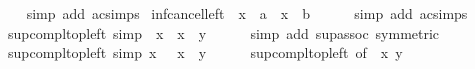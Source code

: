 \begin{isabellebody}
%
\isadelimproof
\ \ %
\endisadelimproof
%
\isatagproof
{}\isamarkupfalse%
\ {\isacharparenleft}{\kern0pt}simp\ add{\isacharcolon}{\kern0pt}\ ac{\isacharunderscore}{\kern0pt}simps{\isacharparenright}{\kern0pt}%
\endisatagproof
{\isafoldproof}%
%
\isadelimproof
\isanewline
%
\endisadelimproof
\isanewline
{}\isamarkupfalse%
\ inf{\isacharunderscore}{\kern0pt}cancel{\isacharunderscore}{\kern0pt}left{}{\isacharcolon}{\kern0pt}\ {\isacartoucheopen}{\isacharminus}{\kern0pt}\ x\ {\isasymsqinter}\ a\ {\isasymsqinter}\ {\isacharparenleft}{\kern0pt}x\ {\isasymsqinter}\ b{\isacharparenright}{\kern0pt}\ {\isacharequal}{\kern0pt}\ {\isasymbottom}{\isacartoucheclose}\isanewline
%
\isadelimproof
\ \ %
\endisadelimproof
%
\isatagproof
{}\isamarkupfalse%
\ {\isacharparenleft}{\kern0pt}simp\ add{\isacharcolon}{\kern0pt}\ ac{\isacharunderscore}{\kern0pt}simps{\isacharparenright}{\kern0pt}%
\endisatagproof
{\isafoldproof}%
%
\isadelimproof
\isanewline
%
\endisadelimproof
\isanewline
{}\isamarkupfalse%
\ sup{\isacharunderscore}{\kern0pt}compl{\isacharunderscore}{\kern0pt}top{\isacharunderscore}{\kern0pt}left{}\ {\isacharbrackleft}{\kern0pt}simp{\isacharbrackright}{\kern0pt}{\isacharcolon}{\kern0pt}\ {\isacartoucheopen}{\isacharminus}{\kern0pt}\ x\ {\isasymsqunion}\ {\isacharparenleft}{\kern0pt}x\ {\isasymsqunion}\ y{\isacharparenright}{\kern0pt}\ {\isacharequal}{\kern0pt}\ {\isasymtop}{\isacartoucheclose}\isanewline
%
\isadelimproof
\ \ %
\endisadelimproof
%
\isatagproof
{}\isamarkupfalse%
\ {\isacharparenleft}{\kern0pt}simp\ add{\isacharcolon}{\kern0pt}\ sup{\isacharunderscore}{\kern0pt}assoc\ {\isacharbrackleft}{\kern0pt}symmetric{\isacharbrackright}{\kern0pt}{\isacharparenright}{\kern0pt}%
\endisatagproof
{\isafoldproof}%
%
\isadelimproof
\isanewline
%
\endisadelimproof
\isanewline
{}\isamarkupfalse%
\ sup{\isacharunderscore}{\kern0pt}compl{\isacharunderscore}{\kern0pt}top{\isacharunderscore}{\kern0pt}left{}\ {\isacharbrackleft}{\kern0pt}simp{\isacharbrackright}{\kern0pt}{\isacharcolon}{\kern0pt}\ {\isacartoucheopen}x\ {\isasymsqunion}\ {\isacharparenleft}{\kern0pt}{\isacharminus}{\kern0pt}\ x\ {\isasymsqunion}\ y{\isacharparenright}{\kern0pt}\ {\isacharequal}{\kern0pt}\ {\isasymtop}{\isacartoucheclose}\isanewline
%
\isadelimproof
\ \ %
\endisadelimproof
%
\isatagproof
{}\isamarkupfalse%
\ sup{\isacharunderscore}{\kern0pt}compl{\isacharunderscore}{\kern0pt}top{\isacharunderscore}{\kern0pt}left{}\ {\isacharbrackleft}{\kern0pt}of\ {\isachardoublequoteopen}{\isacharminus}{\kern0pt}\ x{\isachardoublequoteclose}\ y{\isacharbrackright}{\kern0pt}\ \isamarkupfalse%

\end{isabellebody}
